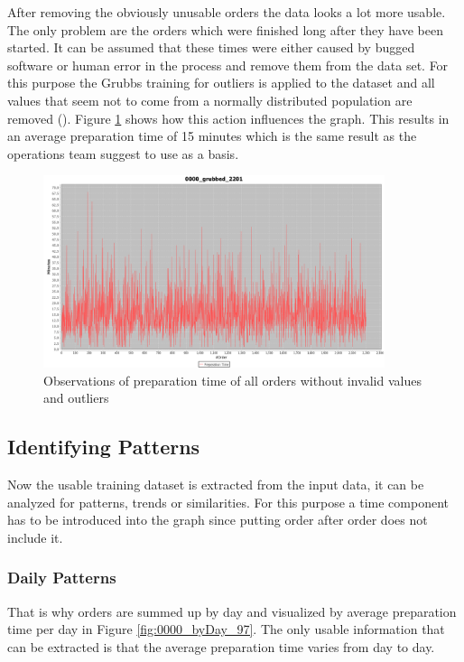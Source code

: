 After removing the obviously unusable orders the data looks a lot more usable. The only problem are the orders which were finished long after they have been started. It can be assumed that these times were either caused by bugged software or human error in the process and remove them from the data set. For this purpose the Grubbs training for outliers is applied to the dataset and all values that seem not to come from a normally distributed population are removed (\cite{Grubbs}). Figure \ref{fig:0000_grubbed_2201} shows how this action influences the graph. This results in an average preparation time of 15 minutes which is the same result as the operations team suggest to use as a basis.

\begin{figure}[h]
\begin{center}
\includegraphics[width=10cm]{images/0000_grubbed_2201.png}
\caption{Observations of preparation time of all orders without invalid values and outliers}
\label{fig:0000_grubbed_2201}
\end{center}
\end{figure}


\subsection{Identifying Patterns}
Now the usable training dataset is extracted from the input data, it can be analyzed for patterns, trends or similarities. For this purpose a time component has to be introduced into the graph since putting order after order does not include it.
\subsubsection{Daily Patterns}
That is why orders are summed up by day and visualized by average preparation time per day in Figure \ref{fig:0000_byDay_97}. The only usable information that can be extracted is that the average preparation time varies from day to day.

